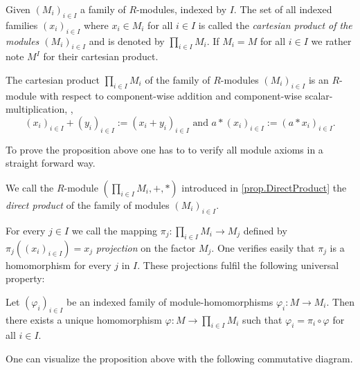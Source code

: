 Given $(M_i)_{i\in I}$ a family of $R$-modules, indexed by $I$. The set of all indexed families $(x_i)_{i\in I}$ where $x_i\in M_i$ for all $i\in I$ is called the \emph{cartesian product of the modules $(M_i)_{i\in I}$} and is denoted by $\prod\limits_{i\in I} M_i$. If $M_i=M$ for all $i\in I$ we rather note $M^I$ for their cartesian product.

\begin{pro}\label{prop.DirectProduct}
The cartesian product $\prod_{i\in I} M_i$ of the family of $R$-modules $(M_i)_{i\in I}$ is an $R$-module with respect to component-wise addition and component-wise scalar-multiplication,  \ie, 
\[(x_i)_{i\in I}+(y_i)_{i\in I}:=(x_i+y_i)_{i\in I}\text{ and }a\ast(x_i)_{i\in I}:=(a\ast x_i)_{i\in I}.\]
\end{pro}

To prove the proposition above one has to to verify all module axioms in a straight forward way.

\begin{defin}\sloppypar
We call the $R$-module $\left(\prod_{i\in I} M_i,+,\ast\right)$ introduced in \cref{prop.DirectProduct} the \emph{direct product} of the family of modules $(M_i)_{i\in I}$.
\end{defin}

For every $j\in I$ we call the mapping $\pi_j\colon \prod_{i\in I} M_i\to M_j$ defined by $\pi_j((x_i)_{i\in I})=x_j$ \emph{projection} on the factor $M_j$. One verifies easily that $\pi_j$ is a homomorphism for every $j$ in $I$. These projections fulfil the following universal property:

\begin{pro}
Let $(\varphi_i)_{i\in I}$ be an indexed family of module-homomorphisms $\varphi_i\colon M\to M_i$. Then there exists a unique homomorphism $\varphi\colon M\to \prod_{i\in I} M_i$ such that $\varphi_i=\pi_i\circ\varphi$ for all $i\in I$.
\end{pro}

One can visualize the proposition above with the following commutative diagram.

\begin{center}
\end{center}

